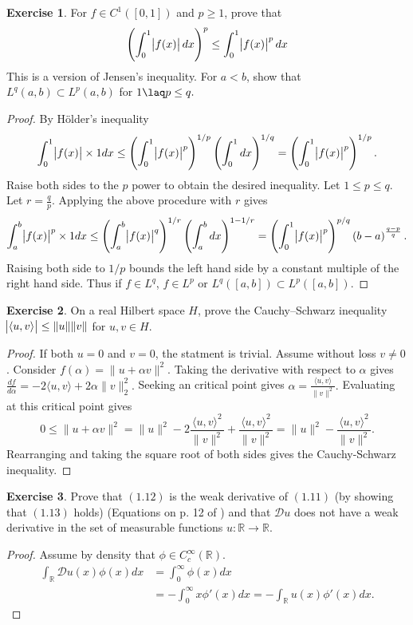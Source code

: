 \documentclass{amsart}
\theoremstyle{plain}
\theoremstyle{definition}
\newtheorem{exer}{Exercise}[section]
\newcommand{\R}{\mathbb{R}}
\begin{document}
\begin{exer}
    For $f\in C^1\left( [0,1] \right)$ and $p\geq 1$, prove that
    $$\left(\int_0^1 \abs{f(x)} dx\right)^p \leq \int_0^1 \abs{f(x)}^p dx$$
    This is a version of Jensen's inequality. For $a<b$, show that $L^q (a,b)\subset L^p(a,b)$ for $1\laq p \leq q.$
\end{exer}
\begin{proof}
By H\"older's inequality
$$\int_0^1 \abs{f(x)}\times 1 dx \leq \left(\int_0^1 \abs{f(x)}^p\right)^{1/p} \left( \int_0^1 dx\right)^{1/q} = \left(\int_0^1 \abs{f(x)}^p\right)^{1/p}.$$ 
Raise both sides to the $p$ power to obtain the desired inequality. Let $1\leq p\leq q$. Let $r = \frac{q}{p}.$ Applying the above procedure with $r$ gives
$$\int_a^b \abs{f(x)}^p\times 1 dx \leq \left(\int_a^b \abs{f(x)}^q\right)^{1/r} \left( \int_a^b dx\right)^{1-1/r} = \left(\int_0^1 \abs{f(x)}^p\right)^{p/q} \left(b-a\right)^{\frac{q-p}{q}}.$$
Raising both side to $1/p$ bounds the left hand side by a constant multiple of the right hand side. Thus if $f\in L^q$, $f\in L^p$ or $L^q([a,b]) \subset L^p([a,b]).$
\end{proof}

\begin{exer}
    On a real Hilbert space $H$, prove the Cauchy–Schwarz inequality $\abs{\langle u, v\rangle}\leq \|u\|\|v\|$ for $u,v\in H.$
\end{exer}
\begin{proof}
If both $u = 0$ and $v= 0$, the statment is trivial. Assume without loss $v \neq 0$. Consider $f(\alpha) = \|u+\alpha v\|^2.$ Taking the derivative with respect to $\alpha$ gives $\frac{df}{d\alpha} = -2\langle u,v\rangle + 2\alpha \|v\|_{2}^{2}.$ Seeking an critical point gives $\alpha = \frac{\langle u,v\rangle}{\|v\|^2}.$ Evaluating at this critical point gives 
$$0\leq \|u+\alpha v\|^2 = \|u\|^2 - 2\frac{\langle u,v\rangle^2}{\|v\|^2}+\frac{\langle u,v\rangle^2}{\|v\|^2} = \|u\|^2 - \frac{\langle u,v\rangle^2}{\|v\|^2}.$$
Rearranging and taking the square root of both sides gives the Cauchy-Schwarz inequality.
\end{proof}

\begin{exer}
    Prove that $(1.12)$ is the weak derivative of $(1.11)$  (by showing that $(1.13)$ holds) (Equations on p. 12 of \cite{lord2014introduction}) and that $\mathcal{D}u$ does not have a weak derivative in the set of measurable functions $u:\R\to\R.$
\end{exer}
\begin{proof}
Assume by density that $\phi \in C^\infty_c(\R).$
    \begin{align*}
        \int_\R \mathcal{D}u(x) \phi(x) dx &= \int_{0}^\infty \phi(x) dx \\
        &= -\int_{0}^\infty x\phi'(x)dx = -\int_{\R} u(x)\phi'(x) dx. 
    \end{align*}
\end{proof}
\end{document}
